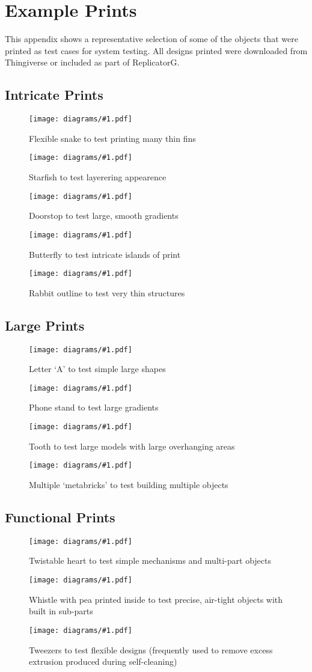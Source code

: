 \newcommand{\examplePrint}[2]{
	\begin{figure}[H]
		\texttt{[image: diagrams/\#1.pdf]}
		\caption{#2}
		\label{fig:#1}
	\end{figure}
}

\chapter{Example Prints}
	
	\label{sec:examplePrints}
	
	This appendix shows a representative selection of some of the objects that
	were printed as test cases for system testing. All designs printed were
	downloaded from Thingiverse or included as part of ReplicatorG.
	
	\section{Intricate Prints}
		
		\examplePrint{snake}{Flexible snake to test printing many thin fins}
		
		\examplePrint{starfish}{Starfish to test layerering appearence}
		
		\examplePrint{doorstop}{Doorstop to test large, smooth gradients}
		
		\examplePrint{butterfly}{Butterfly to test intricate islands of print}
		
		\examplePrint{rabbit}{Rabbit outline to test very thin structures}
		
	\section{Large Prints}
		
		\examplePrint{letter}{Letter `A' to test simple large shapes}
		
		\examplePrint{phoneDock}{Phone stand to test large gradients}
		
		\examplePrint{tooth}{Tooth to test large models with large overhanging areas}
		
		\examplePrint{joblot}{Multiple `metabricks' to test building multiple objects}
		
	\section{Functional Prints}
		
		\examplePrint{heart}{Twistable heart to test simple mechanisms and
		                     multi-part objects}
		
		\examplePrint{whistle}{Whistle with pea printed inside to test precise,
		                       air-tight objects with built in sub-parts}
		
		\examplePrint{tweezers}{Tweezers to test flexible designs (frequently used
		                        to remove excess extrusion produced during
		                        self-cleaning)}
